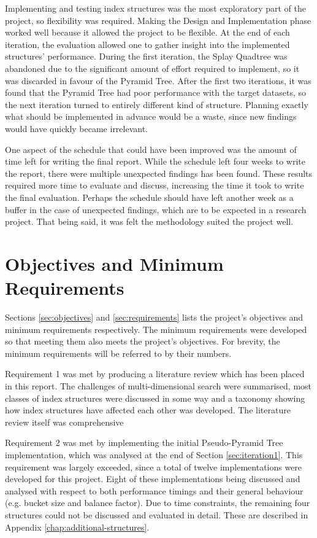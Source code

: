 Implementing and testing index structures was the most exploratory part of the project, so flexibility was required. Making the Design and Implementation phase worked well because it allowed the project to be flexible. At the end of each iteration, the evaluation allowed one to gather insight into the implemented structures' performance.  During the first iteration, the Splay Quadtree was abandoned due to the significant amount of effort required to implement, so it was discarded in favour of the Pyramid Tree. After the first two iterations, it was found that the Pyramid Tree had poor performance with the target datasets, so the next iteration turned to entirely different kind of structure. Planning exactly what should be implemented in advance would be a waste, since new findings would have quickly became irrelevant.

One aspect of the schedule that could have been improved was the amount of time left for writing the final report. While the schedule left four weeks to write the report, there were multiple unexpected findings has been found. These results required more time to evaluate and discuss, increasing the time it took to write the final evaluation. Perhaps the schedule should have left another week as a buffer in the case of unexpected findings, which are to be expected in a research project. That being said, it was felt the methodology suited the project well.

\section{Objectives and Minimum Requirements}

Sections \ref{sec:objectives} and \ref{sec:requirements} lists the project's objectives and minimum requirements respectively. The minimum requirements were developed so that meeting them also meets the project's objectives. For brevity, the minimum requirements will be referred to by their numbers.

Requirement 1 was met by producing a literature review which has been placed in this report. The challenges of multi-dimensional search were summarised, most classes of index structures were discussed in some way and a taxonomy showing how index structures have affected each other was developed. The literature review itself was comprehensive

Requirement 2 was met by implementing the initial Pseudo-Pyramid Tree implementation, which was analysed at the end of Section \ref{sec:iteration1}. This requirement was largely exceeded, since a total of twelve implementations were developed for this project. Eight of these implementations being discussed and analysed with respect to both performance timings and their general behaviour (e.g. bucket size and balance factor). Due to time constraints, the remaining four structures could not be discussed and evaluated in detail. These are described in Appendix \ref{chap:additional-structures}.

